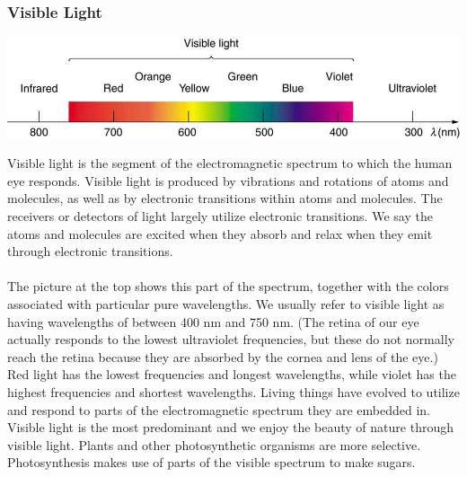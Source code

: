 \documentclass[11pt]{article}
\begin{document}
\subsubsection*{Visible Light}
\begin{center}
	\includegraphics[scale=0.5]{vl}
\end{center}
Visible light is the segment of the electromagnetic spectrum to which the human eye responds. Visible light is produced by vibrations and rotations of atoms and molecules, as well as by electronic transitions within atoms and molecules. The receivers or detectors of light largely utilize electronic transitions. We say the atoms and molecules are excited when they absorb and relax when they emit through electronic transitions. \\ \\
The picture at the top shows this part of the spectrum, together with the colors associated with particular pure wavelengths. We usually refer to visible light as having wavelengths of between 400 nm and 750 nm. (The retina of our eye actually responds to the lowest ultraviolet frequencies, but these do not normally reach the retina because they are absorbed by the cornea and lens of the eye.) Red light has the lowest frequencies and longest wavelengths, while violet has the highest frequencies and shortest wavelengths. 
Living things have evolved to utilize and respond to parts of the electromagnetic spectrum they are embedded in. Visible light is the most predominant and we enjoy the beauty of nature through visible light. Plants and other photosynthetic organisms are more selective. Photosynthesis makes use of parts of the visible spectrum to make sugars.
\end{document}
